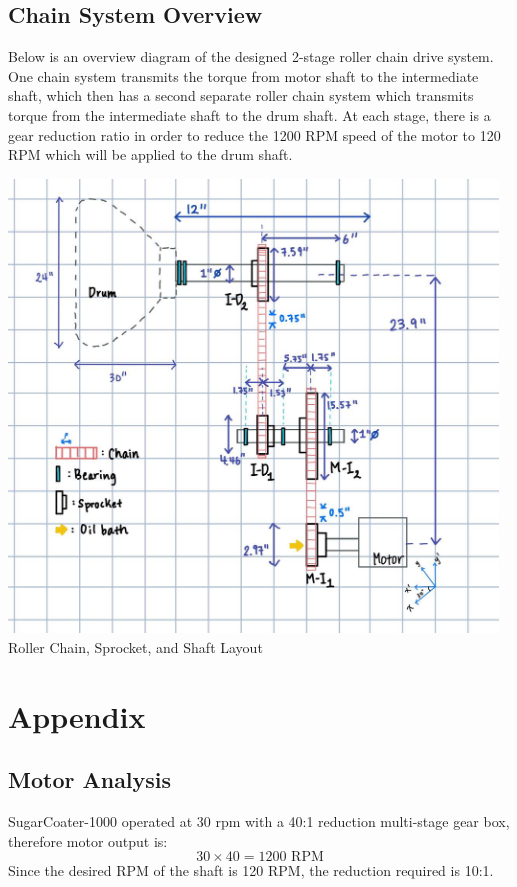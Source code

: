 \documentclass[letterpaper,12pt]{article}
\begin{document}
\subsection{Chain System Overview}
Below is an overview diagram of the designed 2-stage roller chain drive system. One chain system transmits the torque from motor shaft to the intermediate shaft, which then has a second separate roller chain system which transmits torque from the intermediate shaft to the drum shaft. At each stage, there is a gear reduction ratio in order to reduce the 1200 RPM speed of the motor to 120 RPM which will be applied to the drum shaft.
\begin{center}
\includegraphics[width=13cm]{MECH325A2System.jpg} \\
Roller Chain, Sprocket, and Shaft Layout
\end{center}

\newpage

\section{Appendix}
\subsection{Motor Analysis}
SugarCoater-1000 operated at 30 rpm with a 40:1 reduction multi-stage gear box, therefore motor output is:
$$30 \times 40 = 1200 \text{ RPM}$$
Since the desired RPM of the shaft is 120 RPM, the reduction required is 10:1.
\end{document}
